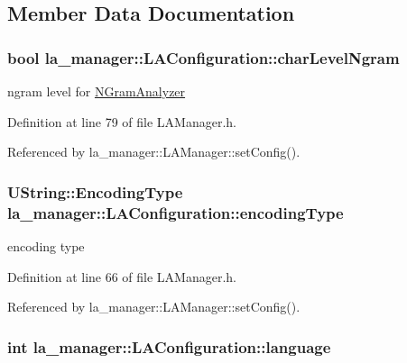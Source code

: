 \subsection{Member Data Documentation}
\hypertarget{classla__manager_1_1LAConfiguration_085289667cf940da6e1ca45c16cacfac}{
\subsubsection[{charLevelNgram}]{\setlength{\rightskip}{0pt plus 5cm}bool {\bf la\_\-manager::LAConfiguration::charLevelNgram}}}
\label{classla__manager_1_1LAConfiguration_085289667cf940da6e1ca45c16cacfac}


ngram level for \hyperlink{classla__manager_1_1NGramAnalyzer}{NGramAnalyzer} 



Definition at line 79 of file LAManager.h.

Referenced by la\_\-manager::LAManager::setConfig().\hypertarget{classla__manager_1_1LAConfiguration_5b41d31f3e921fc03a111ff0162f36a7}{
\subsubsection[{encodingType}]{\setlength{\rightskip}{0pt plus 5cm}UString::EncodingType {\bf la\_\-manager::LAConfiguration::encodingType}}}
\label{classla__manager_1_1LAConfiguration_5b41d31f3e921fc03a111ff0162f36a7}


encoding type 



Definition at line 66 of file LAManager.h.

Referenced by la\_\-manager::LAManager::setConfig().\hypertarget{classla__manager_1_1LAConfiguration_b1d895d5e5fefba04c6e45acb6fb8f2e}{
\subsubsection[{language}]{\setlength{\rightskip}{0pt plus 5cm}int {\bf la\_\-manager::LAConfiguration::language}}}
\label{classla__manager_1_1LAConfiguration_b1d895d5e5fefba04c6e45acb6fb8f2e}


